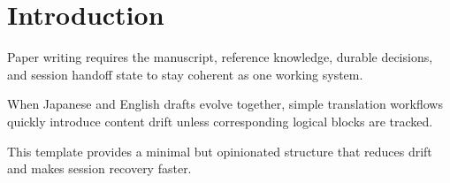 \section{Introduction}

Paper writing requires the manuscript, reference knowledge, durable decisions, and session handoff state to stay coherent as one working system.

When Japanese and English drafts evolve together, simple translation workflows quickly introduce content drift unless corresponding logical blocks are tracked.

This template provides a minimal but opinionated structure that reduces drift and makes session recovery faster.
